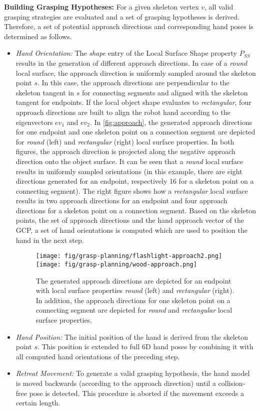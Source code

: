 \textbf{Building Grasping Hypotheses:} For a given skeleton vertex $v$, all valid grasping strategies are evaluated and a set of grasping hypotheses is derived. Therefore, a set of potential approach directions and corresponding hand poses is determined as follows.

\begin{itemize}
\item \textit{Hand Orientation:} The \textit{shape} entry of the Local Surface Shape property $P_{SS}$ results in the generation of different approach directions. 
In case of a \textit{round} local surface, the approach direction is uniformly sampled around the skeleton point $s$. In this case, the approach directions are perpendicular to the skeleton tangent in $s$ for connecting segments and aligned with the skeleton tangent for endpoints. 
%
If the local object shape evaluates to \textit{rectangular}, four approach directions are built to align the robot hand according to the eigenvectors $ev_1$ and $ev_2$.
%
In \autoref{fig:approach}, the generated approach directions for one endpoint and one skeleton point on a connection segment are depicted for \textit{round} (left) and \textit{rectangular} (right) local surface properties. In both figures, the approach direction is projected along the negative approach direction onto the object surface. It can be seen that a \textit{round} local surface results in uniformly sampled orientations (in this example, there are eight directions generated for an endpoint, respectively 16 for a skeleton point on a connecting segment). The right figure shows how a \textit{rectangular} local surface results in two approach directions for an endpoint and four approach directions for a skeleton point on a connection segment.
%
Based on the skeleton points, the set of approach directions and the hand approach vector of the GCP, a set of hand orientations is computed which are used to position the hand in the next step.

\begin{figure}[t!]%
\centering
\texttt{[image: fig/grasp-planning/flashlight-approach2.png]}
\texttt{[image: fig/grasp-planning/wood-approach.png]}
\caption{The generated approach directions are depicted for an endpoint with local surface properties \textit{round} (left) and \textit{rectangular} (right). In addition, the approach directions for one skeleton point on a connecting segment are depicted for \textit{round} and \textit{rectangular} local surface properties.}%
\label{fig:approach}%
\end{figure}

\item \textit{Hand Position:} The initial position of the hand is derived from the skeleton point $s$. This position is extended to full 6D hand poses by combining it with all computed hand orientations of the preceding step.

\item \textit{Retreat Movement:} To generate a valid grasping hypothesis, the hand model is moved backwards (according to the approach direction) until a collision-free pose is detected. This procedure is aborted if the movement exceeds a certain length. 
\end{itemize}

